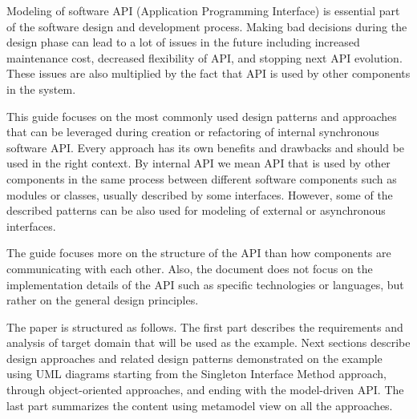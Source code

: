 Modeling of software API (Application Programming Interface) is essential part of the software design
and development process.
Making bad decisions during the design phase can lead to a lot of issues in the future including
increased maintenance cost, decreased flexibility of API, and stopping next API evolution.
These issues are also multiplied by the fact that API is used by other components in the system.

This guide focuses on the most commonly used design patterns and approaches that can be leveraged during creation
or refactoring of internal synchronous software API. Every approach has its own benefits and drawbacks and should be
used in the right context.
By internal API we mean API that is used by other components in the same process between different software components
such as modules or classes, usually described by some interfaces.
However, some of the described patterns can be also used for modeling of external or asynchronous interfaces.

The guide focuses more on the structure of the API than how components are communicating with each other.
Also, the document does not focus on the implementation details of the API such as specific technologies or languages,
but rather on the general design principles.

The paper is structured as follows.
The first part describes the requirements and analysis of target domain that will be used as the example.
Next sections describe design approaches and related design patterns demonstrated on the example using UML diagrams
starting from the Singleton Interface Method approach, through object-oriented approaches,
and ending with the model-driven API\@.
The last part summarizes the content using metamodel view on all the approaches.
